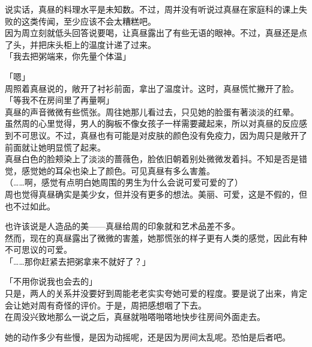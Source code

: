 说实话，真昼的料理水平是未知数。不过，周并没有听说过真昼在家庭科的课上失败的这类传闻，至少应该不会太糟糕吧。\\

因为周立刻就低头回答说要喝，让真昼露出了有些无语的眼神。不过，真昼还是点了头，并把床头柜上的温度计递了过来。\\

「我去把粥端来，你先量个体温」

「嗯」\\

周照着真昼说的，敞开了衬衫前面，拿出了温度计。这时，真昼慌忙撇开了脸。\\

「等我不在房间里了再量啊」\\

真昼的声音微微有些慌张。周往她那儿看过去，只见她的脸蛋有著淡淡的红晕。\\

虽然周的心里觉得，男人的胸板不像女孩子一样需要藏起来，所以对真昼的反应感到不可思议。不过，真昼也有可能是对皮肤的颜色没有免疫力，因为周只是敞开了前面就让她明显慌了起来。\\

真昼白色的脸颊染上了淡淡的蔷薇色，脸依旧朝着别处微微发着抖。不知是否是错觉，感觉她的耳朵也染上了颜色。可见真昼有多么害羞。\\

（……啊，感觉有点明白她周围的男生为什么会说可爱可爱的了）\\

周也觉得真昼确实是美少女，但并没有更多的想法。美丽、可爱，这是不假的，但也不过如此。

也许该说是人造品的美——真昼给周的印象就和艺术品差不多。\\

然而，现在的真昼露出了微微的害羞，她那慌张的样子更有人类的感觉，因此有种不可思议的可爱。\\

「……那你赶紧去把粥拿来不就好了？」

「不用你说我也会去的」\\

只是，两人的关系并没要好到周能老老实实夸她可爱的程度。要是说了出来，肯定会让她对周有奇怪的评价。于是，周把感想咽了下去。\\

在周没兴致地那么一说之后，真昼就啪嗒啪嗒地快步往房间外面走去。

她的动作多少有些慢，是因为动摇呢，还是因为房间太乱呢。恐怕是后者吧。\\

